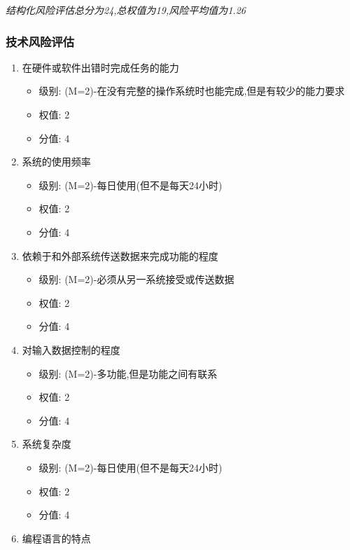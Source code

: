 \documentclass[hyperref, a4paper]{ctexart}
\providecommand{\tightlist}{%
  \setlength{\itemsep}{0pt}\setlength{\parskip}{0pt}}
\begin{document}
\emph{结构化风险评估总分为24,总权值为19,风险平均值为1.26}

\hypertarget{ux6280ux672fux98ceux9669ux8bc4ux4f30}{%
\subsubsection{技术风险评估}\label{ux6280ux672fux98ceux9669ux8bc4ux4f30}}

\begin{enumerate}
\def\labelenumi{\arabic{enumi}.}
\tightlist
\item
  在硬件或软件出错时完成任务的能力

  \begin{itemize}
  \tightlist
  \item
    级别: (M=2)-在没有完整的操作系统时也能完成,但是有较少的能力要求
  \item
    权值: 2
  \item
    分值: 4
  \end{itemize}
\item
  系统的使用频率

  \begin{itemize}
  \tightlist
  \item
    级别: (M=2)-每日使用(但不是每天24小时)
  \item
    权值: 2
  \item
    分值: 4
  \end{itemize}
\item
  依赖于和外部系统传送数据来完成功能的程度

  \begin{itemize}
  \tightlist
  \item
    级别: (M=2)-必须从另一系统接受或传送数据
  \item
    权值: 2
  \item
    分值: 4
  \end{itemize}
\item
  对输入数据控制的程度

  \begin{itemize}
  \tightlist
  \item
    级别: (M=2)-多功能,但是功能之间有联系
  \item
    权值: 2
  \item
    分值: 4
  \end{itemize}
\item
  系统复杂度

  \begin{itemize}
  \tightlist
  \item
    级别: (M=2)-每日使用(但不是每天24小时)
  \item
    权值: 2
  \item
    分值: 4
  \end{itemize}
\item
  编程语言的特点


\end{enumerate}
\end{document}

